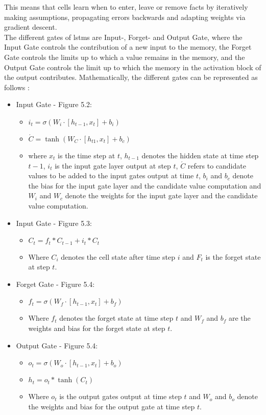 \documentclass[a4paper, 11pt,titlepage,oneside,openany]{book}
\begin{document}
\newpage 
\noindent This means that cells learn when to enter, leave or remove facts by iteratively making assumptions, propagating errors backwards and adapting weights via gradient descent.\\
The different gates of \gls{lstm}s are Input-, Forget- and Output Gate, where the Input Gate controls the contribution of a new input to the memory, the Forget Gate controls the limits up to which a value remains in the memory, and the Output Gate controls the limit up to which the memory in the activation block of the output contributes. Mathematically, the different gates can be represented as follows \cite{rnn}: 
\begin{itemize}
	\item Input Gate - Figure 5.2: 
	\begin{itemize}
		\item $i_t=\sigma(W_i \cdot [h_{t-1}, x_t]+b_i)$
		\item $\acute{C}=\tanh(W_C \cdot [h_{t1}, x_t]+b_c)$
		\item where $x_t$ is the time step at $t$, $h_{t-1}$ denotes the hidden state at time step $t-1$, $i_t$ is the input gate layer output at step $t$, $\acute{C}$ refers to candidate values to be added to the input gates output at time $t$, $b_i$ and $b_c$ denote the bias for the input gate layer and the candidate value computation and $W_i$ and $W_c$ denote the weights for the input gate layer and the candidate value computation.
	\end{itemize}	
	\item  Input Gate - Figure 5.3:
	\begin{itemize}
		\item $C_t=f_t*C_{t-1}+i_t*C_t$
		\item Where $C_i$ denotes the cell state after time step $i$ and $F_t$ is the forget state at step $t$.
	\end{itemize}
	\item Forget Gate - Figure 5.4:
	\begin{itemize}
		\item $f_t=\sigma(W_f \cdot [h_{t-1}, x_t]+b_f)$
		\item Where $f_t$ denotes the forget state at time step $t$ and $W_f$ and $b_f$ are the weights and bias for the forget state at step $t$.
	\end{itemize}
	\item Output Gate - Figure 5.4:
	\begin{itemize}
		\item $o_t=\sigma(W_o \cdot [h_{t-1},x_t]+b_o)$
		\item $h_t=o_t*\tanh(C_t)$
		\item Where $o_t$ is the output gates output at time step $t$ and $W_o$ and $b_o$ denote the weights and bias for the output gate at time step $t$.
	\end{itemize}
\end{itemize}
\end{document}
